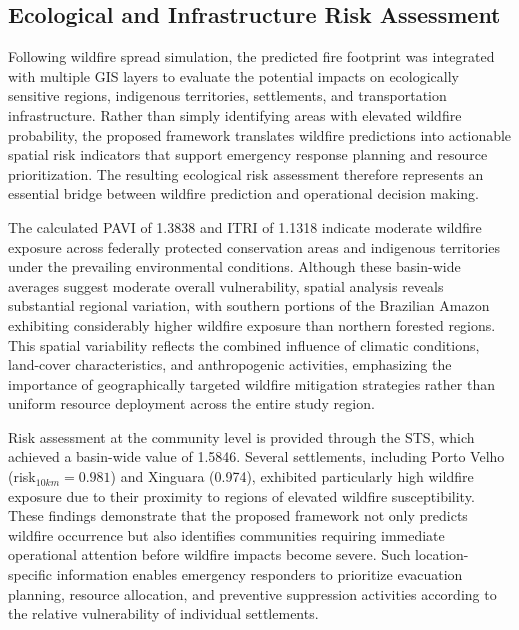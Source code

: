 \documentclass{ieeeaccess}
\begin{document}
\subsection{Ecological and Infrastructure Risk Assessment}
\label{sec:eco-results}

Following wildfire spread simulation, the predicted fire footprint was integrated with multiple GIS layers to evaluate the potential impacts on ecologically sensitive regions, indigenous territories, settlements, and transportation infrastructure. Rather than simply identifying areas with elevated wildfire probability, the proposed framework translates wildfire predictions into actionable spatial risk indicators that support emergency response planning and resource prioritization. The resulting ecological risk assessment therefore represents an essential bridge between wildfire prediction and operational decision making.

The calculated PAVI of 1.3838 and ITRI of 1.1318 indicate moderate wildfire exposure across federally protected conservation areas and indigenous territories under the prevailing environmental conditions. Although these basin-wide averages suggest moderate overall vulnerability, spatial analysis reveals substantial regional variation, with southern portions of the Brazilian Amazon exhibiting considerably higher wildfire exposure than northern forested regions. This spatial variability reflects the combined influence of climatic conditions, land-cover characteristics, and anthropogenic activities, emphasizing the importance of geographically targeted wildfire mitigation strategies rather than uniform resource deployment across the entire study region.

Risk assessment at the community level is provided through the STS, which achieved a basin-wide value of 1.5846. Several settlements, including Porto Velho (risk$_{10km}=0.981$) and Xinguara (0.974), exhibited particularly high wildfire exposure due to their proximity to regions of elevated wildfire susceptibility. These findings demonstrate that the proposed framework not only predicts wildfire occurrence but also identifies communities requiring immediate operational attention before wildfire impacts become severe. Such location-specific information enables emergency responders to prioritize evacuation planning, resource allocation, and preventive suppression activities according to the relative vulnerability of individual settlements.
\end{document}
